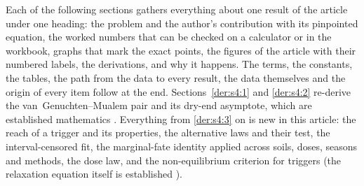 Each of the following sections gathers everything about one result of the article under one heading: the problem and the author's contribution with its pinpointed equation, the worked numbers that can be checked on a calculator or in the workbook, graphs that mark the exact points, the figures of the article with their numbered labels, the derivations, and why it happens. The terms, the constants, the tables, the path from the data to every result, the data themselves and the origin of every item follow at the end. Sections~\ref{der:s4:1} and \ref{der:s4:2} re-derive the van~Genuchten--Mualem pair and its dry-end asymptote, which are established mathematics \citep{vanGenuchten1980,Mualem1976}. Everything from \ref{der:s4:3} on is new in this article: the reach of a trigger and its properties, the alternative laws and their test, the interval-censored fit, the marginal-fate identity applied across soils, doses, seasons and methods, the dose law, and the non-equilibrium criterion for triggers (the relaxation equation itself is established \citep{RossSmettem2000}).
